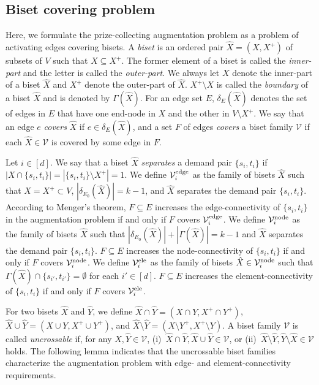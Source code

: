 \documentclass[11pt]{article}
\newcommand{\Vfam}{\mathcal{V}}
\begin{document}
\subsection{Biset covering problem}\label{sec.biset}
Here, we formulate the prize-collecting augmentation problem 
as a problem of activating edges covering bisets.
A {\em biset} is an ordered pair $\hat{X}=(X,X^+)$ of subsets of $V$ such that $X \subseteq
X^+$. The former element of a biset is called the {\em inner-part} and the
letter is called the {\em outer-part}. 
We always let $X$ denote the inner-part of
a biset $\hat{X}$ and $X^+$ denote the outer-part of $\hat{X}$.
$X^+\setminus X$ is called the {\em boundary} of a biset $\hat{X}$ and is denoted
by $\Gamma(\hat{X})$.
For an edge set $E$, $\delta_E(\hat{X})$ denotes the set of edges in
$E$ that have one end-node in $X$ and the other in $V \setminus X^+$.
We say that an edge $e$ {\em covers} $\hat{X}$ if 
$e \in \delta_E(\hat{X})$, and a set $F$ of edges {\em covers} 
a biset family $\Vfam$ if each $\hat{X} \in \Vfam$ is covered by some
edge in $F$.



Let $i \in [d]$.
We say that a biset $\hat{X}$ {\em separates} a demand pair $\{s_i,t_i\}$ if 
$|X \cap \{s_i,t_i\}|=|\{s_i,t_i\}\setminus X^+|=1$.
We define $\Vfam^{\rm edge}_i$ as the family of bisets $\hat{X}$ such that
$X=X^+\subset V$, $|\delta_{E_0}(\hat{X})|=k-1$, and $\hat{X}$ separates 
the demand pair $\{s_i,t_i\}$.
According to Menger's theorem, $F \subseteq E$ 
increases the edge-connectivity of $\{s_i,t_i\}$ in the augmentation problem
if and only if 
$F$ covers $\Vfam^{\rm edge}_i$.
We define $\Vfam^{\rm node}_i$ as the family of bisets $\hat{X}$ such that
$|\delta_{E_0}(\hat{X})|+|\Gamma(\hat{X})|=k-1$ and $\hat{X}$ separates the demand pair $\{s_i,t_i\}$.
$F \subseteq E$ 
increases the node-connectivity of $\{s_i,t_i\}$ 
if and only if 
$F$ covers $\Vfam^{\rm node}_i$.
We define $\Vfam^{\rm ele}_i$ as the family of bisets $\hat{X} \in
\Vfam^{\rm node}_i$ such that
$\Gamma(\hat{X})\cap \{s_{i'},t_{i'}\}=\emptyset$ for each $i' \in [d]$.
$F \subseteq E$ 
increases the element-connectivity of $\{s_i,t_i\}$ 
if and only if 
$F$ covers $\Vfam^{\rm ele}_i$.

For two bisets $\hat{X}$ and $\hat{Y}$, we define
$\hat{X}\cap \hat{Y}= (X\cap Y, X^+ \cap Y^+)$, 
$\hat{X}\cup \hat{Y}= (X\cup Y, X^+ \cup Y^+)$, 
and 
$\hat{X}\setminus \hat{Y}= (X\setminus Y^+, X^+ \setminus Y)$.
A biset family $\Vfam$ is called {\em uncrossable}
if, for any $\hat{X},\hat{Y} \in \Vfam$, 
(i)~$\hat{X}\cap \hat{Y}, \hat{X}\cup \hat{Y}\in \Vfam$, or 
(ii)~$\hat{X}\setminus \hat{Y}, \hat{Y}\setminus \hat{X}\in \Vfam$ holds.
The following lemma indicates that the uncrossable biset families characterize
the augmentation problem with edge- and element-connectivity requirements.
\end{document}
